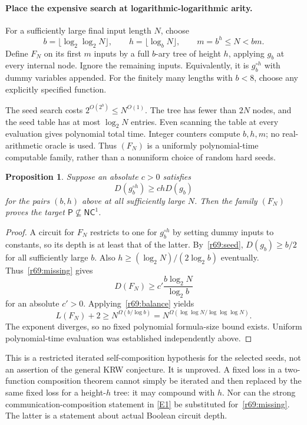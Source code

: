 \documentclass[11pt,a4paper]{article}
\newcommand{\eref}[2]{\hyperlink{extra:#1:#2}{[E#2]}}
\newtheorem{notebookproposition}[notebooklemma]{Proposition}
\numberwithin{equation}{section}
\begin{document}
\paragraph{Place the expensive search at logarithmic-logarithmic arity.}
For a sufficiently large final input length $N$, choose
\[
 b=\lfloor\log_2\log_2N\rfloor,\qquad
 h=\lfloor\log_b N\rfloor,
 \qquad m=b^h\le N<bm.
\]
Define $F_N$ on its first $m$ inputs by a full $b$-ary tree of height $h$, applying $g_b$ at every internal node. Ignore the remaining inputs. Equivalently, it is $g_b^{\circ h}$ with dummy variables appended. For the finitely many lengths with $b<8$, choose any explicitly specified function.

The seed search costs $2^{O(2^b)}\le N^{O(1)}$. The tree has fewer than $2N$ nodes, and the seed table has at most $\log_2N$ entries. Even scanning the table at every evaluation gives polynomial total time. Integer counters compute $b,h,m$; no real-arithmetic oracle is used. Thus $(F_N)$ is a uniformly polynomial-time computable family, rather than a nonuniform choice of random hard seeds.

\begin{notebookproposition}\label{r69:conditional}
Suppose an absolute $c>0$ satisfies
\begin{equation}\label{r69:missing}
 D(g_b^{\circ h})\ge c h D(g_b)
\end{equation}
for the pairs $(b,h)$ above at all sufficiently large $N$. Then the family $(F_N)$ proves the target $\mathsf P\nsubseteq\mathsf{NC}^1$.
\end{notebookproposition}
\begin{proof}
A circuit for $F_N$ restricts to one for $g_b^{\circ h}$ by setting dummy inputs to constants, so its depth is at least that of the latter. By~\eqref{r69:seed}, $D(g_b)\ge b/2$ for all sufficiently large $b$. Also $h\ge(\log_2N)/(2\log_2b)$ eventually. Thus~\eqref{r69:missing} gives
\[
 D(F_N)\ge c'\frac{b\log_2N}{\log_2b}
\]
for an absolute $c'>0$. Applying~\eqref{r69:balance} yields
\begin{equation}\label{r69:lower}
 L(F_N)+2\ge
 N^{\Omega(b/\log b)}
 =N^{\Omega(\log\log N/\log\log\log N)}.
\end{equation}
The exponent diverges, so no fixed polynomial formula-size bound exists. Uniform polynomial-time evaluation was established independently above.
\end{proof}

This is a restricted iterated self-composition hypothesis for the selected seeds, not an assertion of the general KRW conjecture. It is unproved. A fixed loss in a two-function composition theorem cannot simply be iterated and then replaced by the same fixed loss for a height-$h$ tree: it may compound with $h$. Nor can the strong communication-composition statement in \eref{30006707}{1} be substituted for~\eqref{r69:missing}. The latter is a statement about actual Boolean circuit depth.
\end{document}
